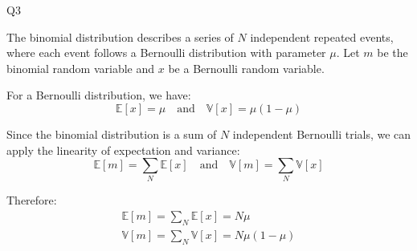 \question Q3\droppoints

\begin{solution}
    The binomial distribution describes a series of $N$ independent repeated events, where each event follows a Bernoulli distribution with parameter $\mu$. Let $m$ be the binomial random variable and $x$ be a Bernoulli random variable.

    For a Bernoulli distribution, we have:
    \[
        \mathbb{E}[x] = \mu
        \quad
        \text{and}
        \quad
        \mathbb{V}[x] = \mu(1 - \mu)
    \]

    Since the binomial distribution is a sum of $N$ independent Bernoulli trials, we can apply the linearity of expectation and variance:
    \[
        \mathbb{E}[m] = \sum_{N}{\mathbb{E}[x]}
        \quad
        \text{and}
        \quad
        \mathbb{V}[m] = \sum_{N}{\mathbb{V}[x]}
    \]

    Therefore:
    \begin{gather*}
        \mathbb{E}[m] = \sum_{N}{\mathbb{E}[x]} = N\mu\\
        \mathbb{V}[m] = \sum_{N}{\mathbb{V}[x]} = N\mu(1 - \mu)\\
    \end{gather*}
\end{solution}